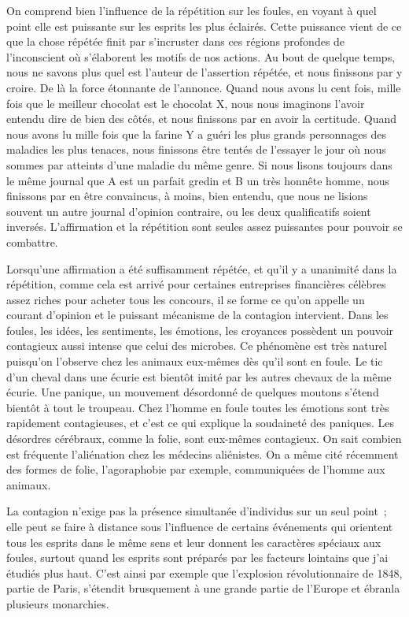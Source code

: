 \documentclass[french,twoside]{book} %
\begin{document}
On comprend bien l’influence de la répétition sur les foules, en voyant à quel point elle est puissante sur les esprits les plus éclairés. Cette puissance vient de ce que la chose répétée finit par s’incruster dans ces régions profondes de l’inconscient où s’élaborent les motifs de nos actions. Au bout de quelque temps, nous ne savons plus quel est l’auteur de l’assertion répétée, et nous finissons par y croire. De là la force étonnante de l’annonce. Quand nous avons lu cent fois, mille fois que le meilleur chocolat est le chocolat X, nous nous imaginons l’avoir entendu dire de bien des côtés, et nous finissons par en avoir la certitude. Quand nous avons lu mille fois que la farine Y a guéri les plus grands personnages des maladies les plus tenaces, nous finissons être tentés de l’essayer le jour où nous sommes par atteints d’une maladie du même genre. Si nous lisons toujours dans le même journal que A est un parfait gre­din et B un très honnête homme, nous finissons par en être convaincus, à moins, bien entendu, que nous ne lisions souvent un autre journal d’opinion contraire, ou les deux qualificatifs soient inversés. L’affirmation et la répétition sont seules assez puissantes pour pouvoir se combattre.\par
Lorsqu’une affirmation a été suffisamment répétée, et qu’il y a unanimité dans la répétition, comme cela est arrivé pour certaines entreprises financières célèbres assez riches pour acheter tous les concours, il se forme ce qu’on appelle un courant d’opi­nion et le puissant mécanisme de la contagion intervient. Dans les foules, les idées, les sentiments, les émotions, les croyances possèdent un pouvoir contagieux aussi intense que celui des microbes. Ce phénomène est très naturel puisqu’on l’observe chez les animaux eux-mêmes dès qu’il sont en foule. Le tic d’un cheval dans une écurie est bientôt imité par les autres chevaux de la même écurie. Une panique, un mouvement désordonné de quelques mou­tons s’étend bientôt à tout le troupeau. Chez l’homme en foule toutes les émotions sont très rapidement contagieuses, et c’est ce qui explique la soudaineté des paniques. Les désordres cérébraux, comme la folie, sont eux-mêmes contagieux. On sait combien est fréquente l’aliénation chez les médecins aliénistes. On a même cité récemment des formes de folie, l’agoraphobie par exemple, communiquées de l’homme aux animaux.\par
La contagion n’exige pas la présence simultanée d’individus sur un seul point ; elle peut se faire à distance sous l’influence de certains événements qui orientent tous les esprits dans le même sens et leur donnent les caractères spéciaux aux foules, surtout quand les esprits sont préparés par les facteurs lointains que j’ai étudiés plus haut. C’est ainsi par exemple que l’explosion révolutionnaire de 1848, partie de Paris, s’étendit brusquement à une grande partie de l’Europe et ébranla plusieurs monar­chies.\par
\end{document}
